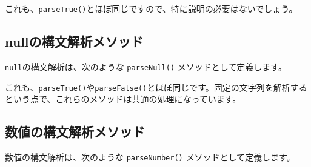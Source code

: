 \begin{Shaded}
\begin{Highlighting}[]
 \NormalTok{() \{}
    \NormalTok{(}\NormalTok{);}
    \NormalTok{();}
     \NormalTok{();}
\NormalTok{\}}
\end{Highlighting}
\end{Shaded}

これも、\texttt{parseTrue()}とほぼ同じですので、特に説明の必要はないでしょう。

\hypertarget{chapter3-nullux306eux69cbux6587ux89e3ux6790ux30e1ux30bdux30c3ux30c9}{%
\subsection{nullの構文解析メソッド}\label{chapter3-nullux306eux69cbux6587ux89e3ux6790ux30e1ux30bdux30c3ux30c9}}

\texttt{null}の構文解析は、次のような \texttt{parseNull()}
メソッドとして定義します。

\begin{Shaded}
\begin{Highlighting}[]
 \NormalTok{() \{}
    \NormalTok{(}\NormalTok{);}
    \NormalTok{();}
     \NormalTok{();}
\NormalTok{\}}
\end{Highlighting}
\end{Shaded}

これも、\texttt{parseTrue()}や\texttt{parseFalse()}とほぼ同じです。固定の文字列を解析するという点で、これらのメソッドは共通の処理になっています。

\hypertarget{chapter3-ux6570ux5024ux306eux69cbux6587ux89e3ux6790ux30e1ux30bdux30c3ux30c9}{%
\subsection{数値の構文解析メソッド}\label{chapter3-ux6570ux5024ux306eux69cbux6587ux89e3ux6790ux30e1ux30bdux30c3ux30c9}}

数値の構文解析は、次のような \texttt{parseNumber()}
メソッドとして定義します。

